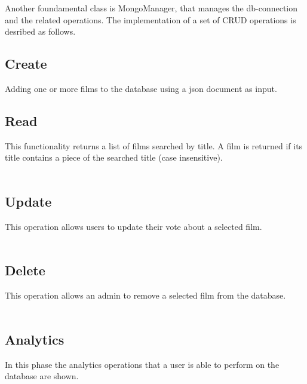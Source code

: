 \documentclass[a4paper, oneside]{article}
\begin{document}
 Another foundamental class is MongoManager, that manages the db-connection and the related operations.
 The implementation of a set of CRUD operations is desribed as follows.


\subsection{Create}
Adding one or more films to the database using a json document as input.
\vspace{2mm}
 \\<Code here>
\vspace{5mm}

\subsection{Read}
This functionality returns a list of films searched by title. A film is returned if its title contains a piece of the searched title (case insensitive).\\
\vspace{2mm}
\\<code here>
\vspace{5mm}

\subsection{Update}
This operation allows users to update their vote about a selected film.\\
\vspace{2mm}
\\<code here>
\vspace{5mm}

\subsection{Delete}
This operation allows an admin to remove a selected film from the database.\\
\vspace{2mm}
\\<code here>
\vspace{5mm}

\clearpage

\subsection{Analytics}
In this phase the analytics operations that a user is able to perform on the database are shown.
\end{document}
